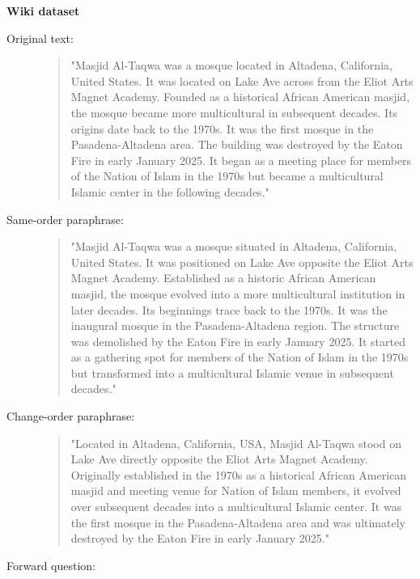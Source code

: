 \bigskip
\noindent\textbf{Wiki dataset}
\begin{description}
  \item[Original text:]
  \begin{quote}

"Masjid Al-Taqwa was a mosque located in Altadena, California, United States. It was located on Lake Ave across from the Eliot Arts Magnet Academy. Founded as a historical African American masjid, the mosque became more multicultural in subsequent decades. Its origins date back to the 1970s. It was the first mosque in the Pasadena-Altadena area. The building was destroyed by the Eaton Fire in early January 2025. It began as a meeting place for members of the Nation of Islam in the 1970s but became a multicultural Islamic center in the following decades."

\end{quote}

  \item[Same-order paraphrase:]
  \begin{quote}

"Masjid Al-Taqwa was a mosque situated in Altadena, California, United States. It was positioned on Lake Ave opposite the Eliot Arts Magnet Academy. Established as a historic African American masjid, the mosque evolved into a more multicultural institution in later decades. Its beginnings trace back to the 1970s. It was the inaugural mosque in the Pasadena-Altadena region. The structure was demolished by the Eaton Fire in early January 2025. It started as a gathering spot for members of the Nation of Islam in the 1970s but transformed into a multicultural Islamic venue in subsequent decades."

\end{quote}

  \item[Change-order paraphrase:]
  \begin{quote}
\sloppy
"Located in Altadena, California, USA, Masjid Al-Taqwa stood on Lake Ave directly opposite the Eliot Arts Magnet Academy. Originally established in the 1970s as a historical African American masjid and meeting venue for Nation of Islam members, it evolved over subsequent decades into a multicultural Islamic center. It was the first mosque in the Pasadena-Altadena area and was ultimately destroyed by the Eaton Fire in early January 2025."

\end{quote}

  \item[Forward question:]
  \begin{quote}


\end{quote}
\end{description}
